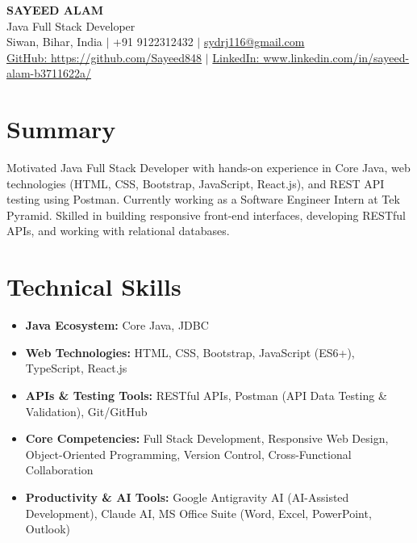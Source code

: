 \documentclass[11pt,a4paper]{article}
\begin{document}
\pagestyle{empty}

\begin{center}
    {\huge \textbf{SAYEED ALAM}} \\ \vspace{2pt}
    {\Large Java Full Stack Developer} \\ \vspace{2pt}
    Siwan, Bihar, India $|$ +91 9122312432 $|$ \href{mailto:sydrj116@gmail.com}{sydrj116@gmail.com} \\
    \href{https://github.com/Sayeed848}{GitHub: https://github.com/Sayeed848} $|$ \href{https://www.linkedin.com/in/sayeed-alam-b3711622a/}{LinkedIn: www.linkedin.com/in/sayeed-alam-b3711622a/}
\end{center}

\vspace{6pt}

\section{Summary}
Motivated Java Full Stack Developer with hands-on experience in Core Java, web technologies (HTML, CSS, Bootstrap, JavaScript, React.js), and REST API testing using Postman. Currently working as a Software Engineer Intern at Tek Pyramid. Skilled in building responsive front-end interfaces, developing RESTful APIs, and working with relational databases.

\section{Technical Skills}
\begin{itemize}[leftmargin=*, itemsep=1pt, parsep=0pt, topsep=2pt]
    \item \textbf{Java Ecosystem:} Core Java, JDBC
    \item \textbf{Web Technologies:} HTML, CSS, Bootstrap, JavaScript (ES6+), TypeScript, React.js
    \item \textbf{APIs \& Testing Tools:} RESTful APIs, Postman (API Data Testing \& Validation), Git/GitHub
    \item \textbf{Core Competencies:} Full Stack Development, Responsive Web Design, Object-Oriented Programming, Version Control, Cross-Functional Collaboration
    \item \textbf{Productivity \& AI Tools:} Google Antigravity AI (AI-Assisted Development), Claude AI, MS Office Suite (Word, Excel, PowerPoint, Outlook)
\end{itemize}
\end{document}
